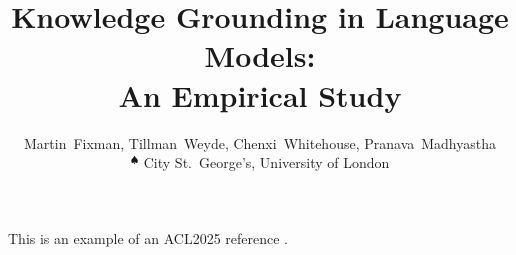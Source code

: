 \documentclass[draft,a4paper,11pt]{article}
\title{Knowledge Grounding in Language Models: \\ An Empirical Study}
\author{%
	Martin~Fixman\spade{}, Tillman~Weyde\spade{}, Chenxi~Whitehouse\spade{}, Pranava~Madhyastha\spade{} \\
	$\phantom{}^\spadesuit{}$ City St.\ George's, University of London%
}
\begin{document}
\maketitle{}















This is an example of an ACL2025 reference \citep{atlas_foundational}.


\end{document}
